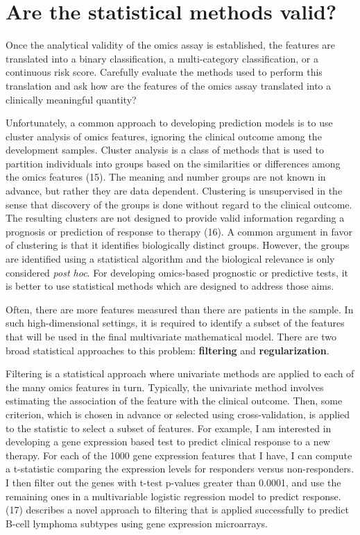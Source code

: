 \documentclass[11pt]{article}
\begin{document}
\section{Are the statistical methods
valid?}\label{are-the-statistical-methods-valid}

Once the analytical validity of the omics assay is established, the
features are translated into a binary classification, a multi-category
classification, or a continuous risk score. Carefully evaluate the
methods used to perform this translation and ask how are the features of
the omics assay translated into a clinically meaningful quantity?

Unfortunately, a common approach to developing prediction models is to
use cluster analysis of omics features, ignoring the clinical outcome
among the development samples. Cluster analysis is a class of methods
that is used to partition individuals into groups based on the
similarities or differences among the omics features (15). The meaning
and number groups are not known in advance, but rather they are data
dependent. Clustering is unsupervised in the sense that discovery of the
groups is done without regard to the clinical outcome. The resulting
clusters are not designed to provide valid information regarding a
prognosis or prediction of response to therapy (16). A common argument
in favor of clustering is that it identifies biologically distinct
groups. However, the groups are identified using a statistical algorithm
and the biological relevance is only considered \emph{post hoc}. For
developing omics-based prognostic or predictive tests, it is better to
use statistical methods which are designed to address those aims.

Often, there are more features measured than there are patients in the
sample. In such high-dimensional settings, it is required to identify a
subset of the features that will be used in the final multivariate
mathematical model. There are two broad statistical approaches to this
problem: \textbf{filtering} and \textbf{regularization}.

Filtering is a statistical approach where univariate methods are applied
to each of the many omics features in turn. Typically, the univariate
method involves estimating the association of the feature with the
clinical outcome. Then, some criterion, which is chosen in advance or
selected using cross-validation, is applied to the statistic to select a
subset of features. For example, I am interested in developing a gene
expression based test to predict clinical response to a new therapy. For
each of the 1000 gene expression features that I have, I can compute a
t-statistic comparing the expression levels for responders versus
non-responders. I then filter out the genes with t-test p-values greater
than 0.0001, and use the remaining ones in a multivariable logistic
regression model to predict response. (17) describes a novel approach to
filtering that is applied successfully to predict B-cell lymphoma
subtypes using gene expression microarrays.
\end{document}

